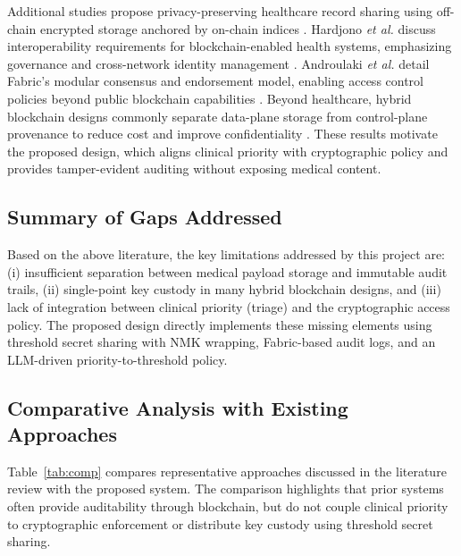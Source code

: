 \documentclass{IEEEtran}
\begin{document}
Additional studies propose privacy-preserving healthcare record sharing using off-chain encrypted storage anchored by on-chain indices \cite{b11}. Hardjono \emph{et al.} discuss interoperability requirements for blockchain-enabled health systems, emphasizing governance and cross-network identity management \cite{b12}. Androulaki \emph{et al.} detail Fabric's modular consensus and endorsement model, enabling access control policies beyond public blockchain capabilities \cite{b7}. Beyond healthcare, hybrid blockchain designs commonly separate data-plane storage from control-plane provenance to reduce cost and improve confidentiality \cite{b9}. These results motivate the proposed design, which aligns clinical priority with cryptographic policy and provides tamper-evident auditing without exposing medical content.

\subsection{Summary of Gaps Addressed}
Based on the above literature, the key limitations addressed by this project are: (i) insufficient separation between medical payload storage and immutable audit trails, (ii) single-point key custody in many hybrid blockchain designs, and (iii) lack of integration between clinical priority (triage) and the cryptographic access policy. The proposed design directly implements these missing elements using threshold secret sharing with NMK wrapping, Fabric-based audit logs, and an LLM-driven priority-to-threshold policy.

\subsection{Comparative Analysis with Existing Approaches}
Table~\ref{tab:comp} compares representative approaches discussed in the literature review with the proposed system. The comparison highlights that prior systems often provide auditability through blockchain, but do not couple clinical priority to cryptographic enforcement or distribute key custody using threshold secret sharing.
\end{document}
